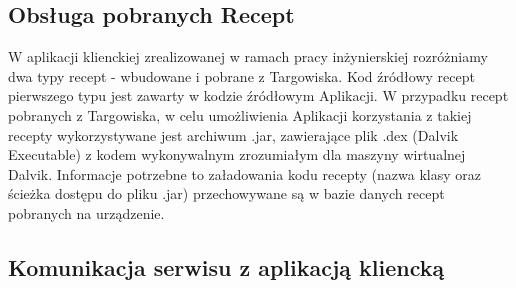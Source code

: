 \documentclass[11pt,a4paper,polish,thesis]{dcsbook}
\begin{document}
\subsection {Obsługa pobranych Recept}
W aplikacji klienckiej zrealizowanej w ramach pracy inżynierskiej rozróżniamy dwa typy recept - wbudowane i pobrane z Targowiska. Kod źródłowy recept pierwszego typu jest zawarty w kodzie źródłowym Aplikacji. W przypadku recept pobranych z Targowiska, w celu umożliwienia Aplikacji korzystania z takiej recepty wykorzystywane jest archiwum .jar, zawierające plik .dex (Dalvik Executable) z kodem wykonywalnym  zrozumiałym dla maszyny wirtualnej Dalvik. Informacje potrzebne to załadowania kodu recepty (nazwa klasy oraz ścieżka dostępu do pliku .jar) przechowywane są w bazie danych recept pobranych na urządzenie. 
\subsection{Komunikacja serwisu z aplikacją kliencką}
\end{document}
